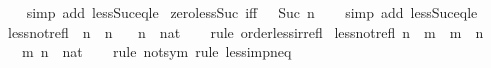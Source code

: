 \begin{isabellebody}
%
\isadelimproof
\ \ %
\endisadelimproof
%
\isatagproof
{}\isamarkupfalse%
\ {\isacharparenleft}{\kern0pt}simp\ add{\isacharcolon}{\kern0pt}\ less{\isacharunderscore}{\kern0pt}Suc{\isacharunderscore}{\kern0pt}eq{\isacharunderscore}{\kern0pt}le{\isacharparenright}{\kern0pt}%
\endisatagproof
{\isafoldproof}%
%
\isadelimproof
\isanewline
%
\endisadelimproof
\isanewline
{}\isamarkupfalse%
\ zero{\isacharunderscore}{\kern0pt}less{\isacharunderscore}{\kern0pt}Suc\ {\isacharbrackleft}{\kern0pt}iff{\isacharbrackright}{\kern0pt}{\isacharcolon}{\kern0pt}\ {\isachardoublequoteopen}{}\ {\isacharless}{\kern0pt}\ Suc\ n{\isachardoublequoteclose}\isanewline
%
\isadelimproof
\ \ %
\endisadelimproof
%
\isatagproof
{}\isamarkupfalse%
\ {\isacharparenleft}{\kern0pt}simp\ add{\isacharcolon}{\kern0pt}\ less{\isacharunderscore}{\kern0pt}Suc{\isacharunderscore}{\kern0pt}eq{\isacharunderscore}{\kern0pt}le{\isacharparenright}{\kern0pt}%
\endisatagproof
{\isafoldproof}%
%
\isadelimproof
%
\endisadelimproof
%
\isadelimdocument
%
\endisadelimdocument
%
\isatagdocument
%
\isamarkuptrue%
%
\endisatagdocument
{\isafolddocument}%
%
\isadelimdocument
%
\endisadelimdocument
{}\isamarkupfalse%
\ less{\isacharunderscore}{\kern0pt}not{\isacharunderscore}{\kern0pt}refl{\isacharcolon}{\kern0pt}\ {\isachardoublequoteopen}{\isasymnot}\ n\ {\isacharless}{\kern0pt}\ n{\isachardoublequoteclose}\isanewline
\ \ \ n\ {\isacharcolon}{\kern0pt}{\isacharcolon}{\kern0pt}\ nat\isanewline
%
\isadelimproof
\ \ %
\endisadelimproof
%
\isatagproof
{}\isamarkupfalse%
\ {\isacharparenleft}{\kern0pt}rule\ order{\isacharunderscore}{\kern0pt}less{\isacharunderscore}{\kern0pt}irrefl{\isacharparenright}{\kern0pt}%
\endisatagproof
{\isafoldproof}%
%
\isadelimproof
\isanewline
%
\endisadelimproof
\isanewline
{}\isamarkupfalse%
\ less{\isacharunderscore}{\kern0pt}not{\isacharunderscore}{\kern0pt}refl{}{\isacharcolon}{\kern0pt}\ {\isachardoublequoteopen}n\ {\isacharless}{\kern0pt}\ m\ {\isasymLongrightarrow}\ m\ {\isasymnoteq}\ n{\isachardoublequoteclose}\isanewline
\ \ \ m\ n\ {\isacharcolon}{\kern0pt}{\isacharcolon}{\kern0pt}\ nat\isanewline
%
\isadelimproof
\ \ %
\endisadelimproof
%
\isatagproof
{}\isamarkupfalse%
\ {\isacharparenleft}{\kern0pt}rule\ not{\isacharunderscore}{\kern0pt}sym{\isacharparenright}{\kern0pt}\ {\isacharparenleft}{\kern0pt}rule\ less{\isacharunderscore}{\kern0pt}imp{\isacharunderscore}{\kern0pt}neq{\isacharparenright}{\kern0pt}%

\end{isabellebody}
